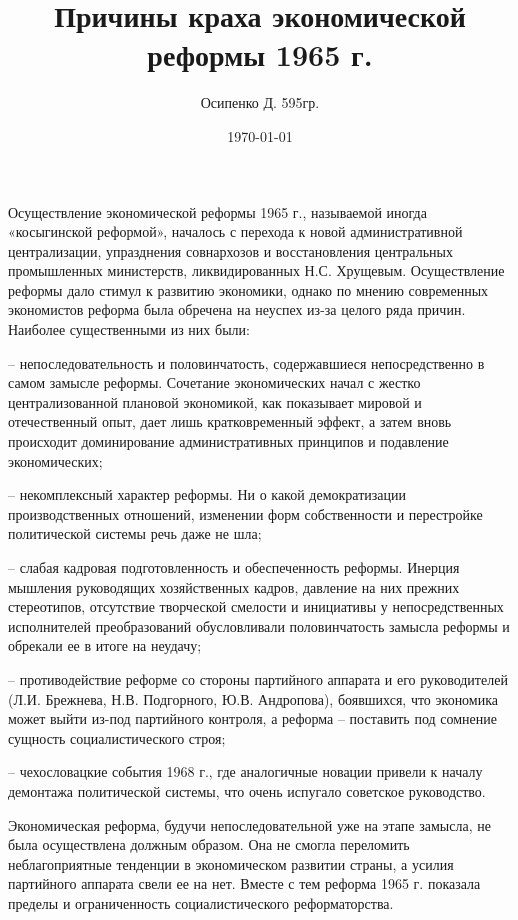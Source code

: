 \documentclass[a4paper, 12pt]{article}
\title{Причины краха экономической реформы 1965 г.}
\author{Осипенко Д. 595гр.}
\date{\today}
\begin{document}
\sffamily
\maketitle
Осуществление экономической реформы 1965 г., называемой иногда «косыгинской реформой», началось с перехода к новой административной централизации, упразднения совнархозов и восстановления центральных промышленных министерств, ликвидированных Н.С. Хрущевым. Осуществление реформы дало стимул к развитию экономики, однако по мнению современных экономистов реформа была обречена на неуспех из-за целого ряда причин. Наиболее существенными из них были:

– непоследовательность и половинчатость, содержавшиеся непосредственно в самом замысле реформы. Сочетание экономических начал с жестко централизованной плановой экономикой, как показывает мировой и отечественный опыт, дает лишь кратковременный эффект, а затем вновь происходит доминирование административных принципов и подавление экономических;

– некомплексный характер реформы. Ни о какой демократизации производственных отношений, изменении форм собственности и перестройке политической системы речь даже не шла;

– слабая кадровая подготовленность и обеспеченность реформы. Инерция мышления руководящих хозяйственных кадров, давление на них прежних стереотипов, отсутствие творческой смелости и инициативы у непосредственных исполнителей преобразований обусловливали половинчатость замысла реформы и обрекали ее в итоге на неудачу;

– противодействие реформе со стороны партийного аппарата и его руководителей (Л.И. Брежнева, Н.В. Подгорного, Ю.В. Андропова), боявшихся, что экономика может выйти из-под партийного контроля, а реформа – поставить под сомнение сущность социалистического строя;

– чехословацкие события 1968 г., где аналогичные новации привели к началу демонтажа политической системы, что очень испугало советское руководство.

Экономическая реформа, будучи непоследовательной уже на этапе замысла, не была осуществлена должным образом. Она не смогла переломить неблагоприятные тенденции в экономическом развитии страны, а усилия партийного аппарата свели ее на нет. Вместе с тем реформа 1965 г. показала пределы и ограниченность социалистического реформаторства.
\end{document}
